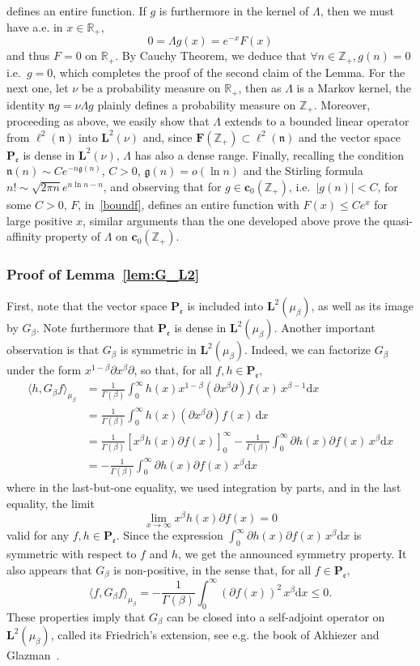 \documentclass[AHL,Unicode,longabstracts]{cedram}
\newcommand{\RR}{\mathbb{R}}
\newcommand{\ZZ}{\mathbb{Z}}
\newcommand{\fe}{\mathfrak{e}}
\newcommand{\iy}{\infty}
\newcommand{\lt}{\left}
\newcommand{\pa}{\partial}
\newcommand{\ri}{\rightarrow}
\newcommand{\rt}{\right}
\newcommand{\Bg}{G}
\newcommand{\esP}{\mathbf{P}}
\newcommand{\esL}{\mathbf{L}}
\newcommand{\esLd}{\ell}
\newcommand{\esF}{\mathbf{F}}
\newcommand{\esc}{\mathbf{c}}
\newcommand{\esPe}{\esP_{\! \fe}}
\let\oldforall\forall
\renewcommand*{\forall}{\mathrel{\oldforall}}
\newcommand*{\dd}{\mathrm{d}}
\newcommand*{\dx}{\dd x}
\begin{document}
defines an entire function. If $g$ is furthermore in the kernel of $\Lambda$, then we must have a.e. in $x\in\RR_+$,
\[
0 = \Lambda g(x) = e^{-x}F(x)
\]
and thus $F=0$ on $\RR_+$. By Cauchy Theorem, we deduce that $\forall n\in\ZZ_+, g(n) =0$ i.e.~$g=0$, which completes the proof of the second claim of the Lemma. For the next one, let $\nu$ be a probability measure on $\RR_+$, then as $\Lambda$ is a Markov kernel, the identity $\mathfrak n g = \nu \Lambda g$ plainly defines a probability measure on $\ZZ_+$. Moreover, proceeding as above, we easily show that $\Lambda$ extends to a bounded linear operator from $\esLd^2(\mathfrak n)$ into $\esL^2(\nu)$ and, since $\esF(\ZZ_+) \subset \esLd^2(\mathfrak n) $ and the vector space $\esPe$ is dense in $\esL^2(\nu)$, $\Lambda$ has also a dense range. Finally, recalling the condition $\mathfrak{n}(n)\sim C e^{-n \mathfrak{g}(n)}$, $C>0$, $\mathfrak{g}(n)=o(\ln n)$ and the Stirling formula $n! \sim \sqrt{2 \pi n}e^{n \ln n -n}$, and observing that for $g\in \esc_0(\ZZ_+)$, i.e.~$|g(n)|<C $, for some $C>0$, $F$, in~\eqref{boundf}, defines an entire function with $F(x)\leq C e^{x}$ for large positive $x$, similar arguments than the one developed above prove the quasi-affinity property of $\Lambda$ on $\esc_0(\ZZ_+)$.


\subsubsection{Proof of Lemma~\ref{lem:G_L2}} First, note that the vector space $\esPe$ is included into $\esL^2(\mu_{\beta})$, as well as its image by $\Bg_{\beta}$. Note furthermore that $\esPe$ is dense in $\esL^2(\mu_{\beta})$. Another important observation is that $\Bg_{\beta}$ is symmetric in $\esL^2(\mu_{\beta})$. Indeed, we can factorize $\Bg_{\beta}$ under the form $x^{1-\beta}\pa x^{\beta}\pa$, so that, for all $ f, h \in \esPe,$
\begin{align*}
\langle h,\Bg_{\beta} f\rangle_{\mu_{\beta}}&=\frac1{\Gamma(\beta)}\int_0^{\iy} h(x) x^{1-\beta}(\pa x^{\beta}\pa) f(x)\, x^{\beta-1}\dx\\
&=\frac1{\Gamma(\beta)}\int_0^{\iy} h(x) (\pa x^{\beta}\pa) f(x)\, \dx\\
&=\frac1{\Gamma(\beta)}\lt[x^{\beta}h(x)\pa f(x)\rt]_0^{\iy}-\frac1{\Gamma(\beta)}\int_0^{\iy }
\pa h(x) \pa f(x)\, x^{\beta} \dx\\
&=-\frac1{\Gamma(\beta)}\int_0^{\iy}
\pa h(x) \pa f(x)\, x^{\beta} \dx
\end{align*}
where in the last-but-one equality, we used integration by parts, and in the last equality, the limit
\[
\lim_{x\ri\iy } x^{\beta}h(x)\pa f(x)=0
\]
valid for any $f,h\in\esPe$. Since the expression $\int_0^{\iy }
\pa h(x) \pa f(x)\, x^{\beta} \dx$ is symmetric with respect to $f$ and $h$, we get the announced symmetry property. It also appears that $\Bg_{\beta}$ is non-positive, in the sense that, for all $f\in\esPe,$
\[
\langle f,\Bg_{\beta} f\rangle_{\mu_{\beta}}= -\frac1{\Gamma(\beta)}\int_0^{\iy } (\pa f(x))^2\, x^{\beta} \dx
\leq 0.
\]
These properties imply that $\Bg_{\beta}$ can be closed into a self-adjoint operator on $\esL^2(\mu_{\beta})$, called its Friedrich's extension, see e.g. the book of Akhiezer and Glazman~\cite{MR615737}.
\end{document}
